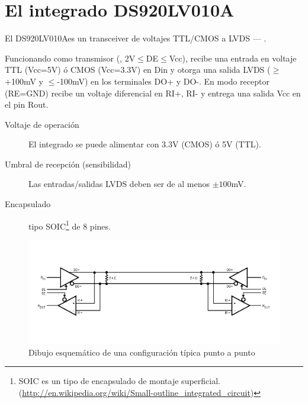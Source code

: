 \documentclass[a4paper]{article}
\begin{document}
%
%
\maketitle\thispagestyle{fancy}
%
\newcommand{\ic}{DS920LV010A} %
% 
\section{El integrado \ic}
%
El \ic es un transceiver de voltajes TTL/CMOS a LVDS --- .

Funcionando como transmisor (, 2V$\leq$DE$\leq$Vcc), recibe una entrada en voltaje TTL
(Vcc=5V) ó CMOS (Vcc=3.3V) en Din y otorga una salida LVDS ($\geq$+100mV y $\leq$-100mV) en los terminales DO+ y DO-.
En modo receptor (RE=GND) recibe un voltaje diferencial en RI+, RI- y entrega una salida Vcc en el
pin Rout.
%
\begin{description}
\item[Voltaje de operación] El integrado se puede alimentar con 3.3V (CMOS) ó 5V (TTL).
\item[Umbral de recepción (sensibilidad)] Las entradas/salidas LVDS deben ser de al menos $\pm 100$mV.
\item[Encapsulado] tipo SOIC\footnote{SOIC es un tipo de encapsulado de montaje superficial. (\url{http://en.wikipedia.org/wiki/Small-outline_integrated_circuit})} de 8 pines.
\end{description}
%
%
\begin{figure}[h]
\includegraphics[width=15cm]{img/ej1a}
\caption{Dibujo esquemático de una configuración típica punto a punto}
\end{figure}
\end{document}
